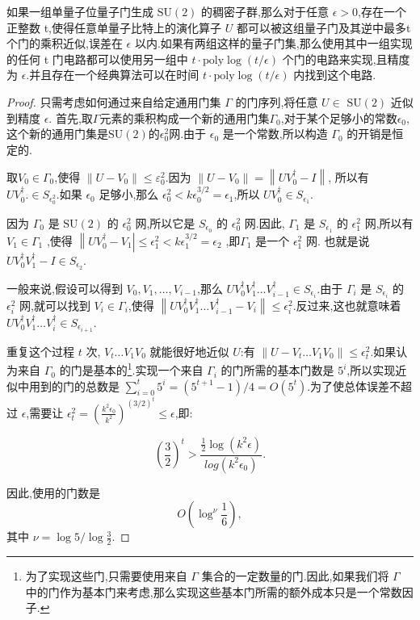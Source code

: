 \begin{theorem} 
	如果一组单量子位量子门生成 $\mathrm{SU}(2)$ 的稠密子群,那么对于任意 $\epsilon > 0$,存在一个正整数 t,使得任意单量子比特上的演化算子 $U$ 都可以被这组量子门及其逆中最多t个门的乘积近似,误差在 $\epsilon$ 以内.如果有两组这样的量子门集,那么使用其中一组实现的任何 t 门电路都可以使用另一组中 $t \cdot \text{poly}\log(t/\epsilon)$ 个门的电路来实现,且精度为 $\epsilon$.并且存在一个经典算法可以在时间 $t \cdot \text{poly}\log(t/\epsilon)$ 内找到这个电路.\cite{48}
\end{theorem}
\begin{proof}
	只需考虑如何通过来自给定通用门集 $\Gamma$ 的门序列,将任意 $U \in$ $\mathrm{SU}(2)$ 近似到精度 $\epsilon$.
	首先,取$\Gamma$元素的乘积构成一个新的通用门集$\Gamma_0$,对于某个足够小的常数$\epsilon_0$,这个新的通用门集是$\mathrm{SU}(2)$的$\epsilon_0^2$网.由于 $\epsilon_0$ 是一个常数,所以构造 $\Gamma_0$ 的开销是恒定的.
	
	取$V_0 \in \Gamma_0$,使得 $\left\|U-V_0\right\| \leq \varepsilon_0^2$.因为 $\left\|U-V_0\right\|=\left\|U V_0^{\dagger}-I\right\|$, 所以有 $U V_0^{\dagger}. \in S_{\epsilon_0^2}$.如果 $\epsilon_0$ 足够小,那么 $\epsilon_0^2<k \epsilon_0^{3/2}=\epsilon_1$,所以 $U V_0^{\dagger} \in S_{\epsilon_1}$.
	
	因为 $\Gamma_0$ 是 $\mathrm{SU}(2)$ 的 $\epsilon_0^2$ 网,所以它是 $S_{\epsilon_0}$ 的 $\epsilon_0^2$ 网.因此, $\Gamma_1$ 是 $S_{\epsilon_1}$ 的 $\epsilon_1^2$ 网,所以有$V_1 \in \Gamma_1$ ,使得 $\left\|U V_0^{\dagger}-V_1\right| \leq \epsilon_1^2<k \epsilon_1^{3 / 2}=\epsilon_2$ ,即$\Gamma_1$ 是一个 $\epsilon_1^2$ 网. 也就是说 $U V_0^{\dagger} V_1^{\dagger}-I \in S_{\epsilon_2}$.
	
	一般来说,假设可以得到 $V_0, V_1, \ldots, V_{i-1}$,那么 $U V_0^{\dagger} V_1^\dagger \ldots V_{i-1}^\dagger \in S_{\epsilon_i}$.由于 $\Gamma_i$ 是 $S_{\epsilon_i}$ 的 $\epsilon_i^2$ 网,就可以找到 $V_i \in \Gamma_i$,使得 $\left\|U V_0^\dagger V_1^\dagger \ldots V_{i-1}^\dagger - V_i\right\| \leq \epsilon_i^2$.反过来,这也就意味着 $U V_0^\dagger V_1^\dagger \dots V_i^\dagger \in S_{\epsilon_{i+1}}$.
	
	重复这个过程 $t$ 次, $V_t \ldots V_1 V_0$ 就能很好地近似 $U$:有 $\left\|U-V_t \ldots V_1 V_0\right\|\leq \epsilon_t^2$.如果认为来自 $\Gamma_0$ 的门是基本的\footnote{为了实现这些门,只需要使用来自 $\Gamma$ 集合的一定数量的门.因此,如果我们将 $\Gamma$ 中的门作为基本门来考虑,那么实现这些基本门所需的额外成本只是一个常数因子.}.实现一个来自 $\Gamma_i$ 的门所需的基本门数是 $5^i$,所以实现近似中用到的门的总数是 $\sum_{i=0}^t 5^i=\left(5^{t+1}-1\right) / 4=O\left(5^t\right)$.为了使总体误差不超过 $\epsilon$,需要让 $\epsilon_t^2=\left(\frac{k^2 \epsilon_0}{k^2}\right)^{(3 / 2)^t} \leq \epsilon$,即:   
	
	\begin{equation}
		\left(\frac{3}{2}\right)^t>\frac{\frac{1}{2} \log \left(k^2 \epsilon\right)}{log \left(k^2 \epsilon_0\right)}.
	\end{equation}
	
	因此,使用的门数是 
	$$
	O\left(\log ^{\nu} \frac{1}{6}\right),
	$$ 
	其中 $\nu=\log 5 / \log \frac{3}{2}$.
	
\end{proof}
